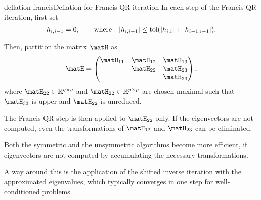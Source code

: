 \begin{Algorithm*}{deflation-francis}{Deflation for Francis QR iteration}
  In each step of the Francis QR iteration, first set
  \begin{gather}
    h_{i,i-1} = 0, \qquad \text{where}\quad
    \lvert h_{i,i-1}\rvert \le \text{tol} (\lvert h_{i,i}\rvert+\lvert h_{i-1,i-1}\rvert).
  \end{gather}

  Then, partition the matrix
  $\matH$ as
  \begin{gather}
    \matH =
    \begin{pmatrix}
      \matH_{11} & \matH_{12} & \matH_{13} \\
      & \matH_{22} & \matH_{23}\\
      && \matH_{33}
    \end{pmatrix},
  \end{gather}
  where $\matH_{22}\in\R^{q\times q}$ and
  $\matH_{22}\in\R^{p\times p}$ are chosen maximal such that
  $\matH_{33}$ is upper  and $\matH_{22}$
  is unreduced.

  The Francis QR step is then applied to $\matH_{22}$ only. If the
  eigenvectors are not computed, even the transformations of
  $\matH_{12}$ and $\matH_{23}$ can be eliminated.
\end{Algorithm*}

\begin{remark}
  Both the symmetric and the unsymmetric algorithms become more
  efficient, if eigenvectors are not computed by accumulating the
  necessary transformations.

  A way around this is the application of the shifted inverse
  iteration with the approximated eigenvalues, which typically
  converges in one step for well-conditioned problems.
\end{remark}


